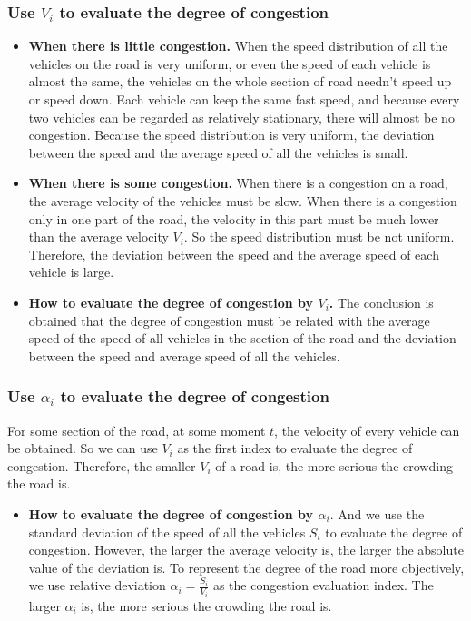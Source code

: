 \documentclass[UTF8]{mcmthesis}
\begin{document}
\subsubsection{Use $V_{i}$ to evaluate the degree of congestion}
\begin{itemize}
\item{\textbf{When there is little congestion.} \indent When the speed distribution of all the vehicles on the road is very uniform, or even the speed of each vehicle is almost the same, the vehicles on the whole section of road needn't speed up or speed down. Each vehicle can keep the same fast speed, and because every two vehicles can be regarded as relatively stationary, there will almost be no congestion. Because the speed distribution is very uniform, the deviation between the speed and the average speed of all the vehicles is small.}
\end{itemize}
\begin{itemize}
\item{\textbf{When there is some congestion.} When there is a congestion on a road, the average velocity of the vehicles must be slow. When there is a congestion only in one part of the road, the velocity in this part must be much lower than the average velocity $ V_{i} $. So the speed distribution must be not uniform. Therefore, the deviation between the speed and the average speed of each vehicle is large. }
\end{itemize}

\begin{itemize}
\item{\textbf{How to evaluate the degree of congestion by $V_{i}$.} The conclusion is obtained that the degree of congestion must be related with the average speed of the speed of all vehicles in the section of the road and the deviation between the speed and average speed of all the vehicles.}
\end{itemize}

\subsubsection{Use $\alpha_{i}$ to evaluate the degree of congestion}
\indent For some section of the road, at some moment $t$, the velocity of every vehicle can be obtained. So we can use $ V_{i} $ as the first index to evaluate the degree of congestion. Therefore, the smaller $V_{i}$ of a road is, the more serious the crowding the road is.

\begin{itemize}
\item{\textbf{How to evaluate the degree of congestion by $\alpha_{i}$}. And we use the standard deviation of the speed of all the vehicles $S_{i}$ to evaluate the degree of congestion. However, the larger the average velocity is, the larger the absolute value of the deviation is. To represent the degree of the road more objectively, we use relative deviation $\alpha_{i} =\frac{S_{i } }{V_{i}} $ as the congestion evaluation index. The larger $\alpha_{i}$ is, the more serious the crowding the road is.}
\end{itemize}
\end{document}
